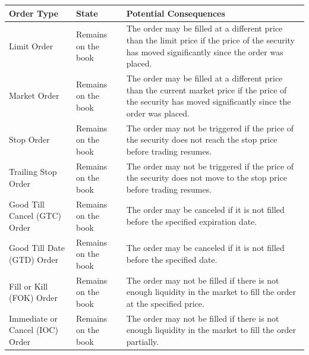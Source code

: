 \documentclass[11pt]{article}
\begin{document}
\begin{center}
\begin{tabular}{lll}
\hline
Order Type & State & Potential Consequences\\[0pt]
\hline
Limit Order & Remains on the book & The order may be filled at a different price than the limit price if the price of the security has moved significantly since the order was placed.\\[0pt]
Market Order & Remains on the book & The order may be filled at a different price than the current market price if the price of the security has moved significantly since the order was placed.\\[0pt]
Stop Order & Remains on the book & The order may not be triggered if the price of the security does not reach the stop price before trading resumes.\\[0pt]
Trailing Stop Order & Remains on the book & The order may not be triggered if the price of the security does not move to the stop price before trading resumes.\\[0pt]
Good Till Cancel (GTC) Order & Remains on the book & The order may be canceled if it is not filled before the specified expiration date.\\[0pt]
Good Till Date (GTD) Order & Remains on the book & The order may be canceled if it is not filled before the specified date.\\[0pt]
Fill or Kill (FOK) Order & Remains on the book & The order may not be filled if there is not enough liquidity in the market to fill the order at the specified price.\\[0pt]
Immediate or Cancel (IOC) Order & Remains on the book & The order may not be filled if there is not enough liquidity in the market to fill the order partially.\\[0pt]
\hline
\end{tabular}
\end{center}
\end{document}
